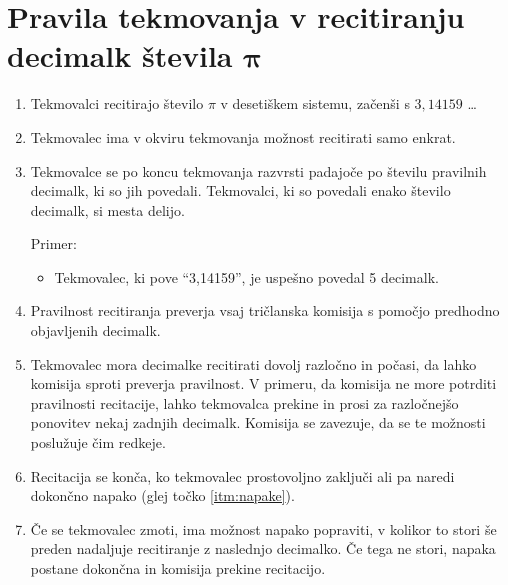 \documentclass[a4paper,oneside,12pt]{article}
\title{\Title}
\author{\Author}
\date{\today}
\theoremstyle{definition}
\begin{document}
\section*{Pravila tekmovanja v recitiranju decimalk števila $\boldsymbol \pi$}

\vspace{3ex}

\begin{enumerate}
  \item Tekmovalci recitirajo število $\pi$ v desetiškem sistemu, začenši s $3,14159$ \ldots
  \item Tekmovalec ima v okviru tekmovanja možnost recitirati samo enkrat.
  \item Tekmovalce se po koncu tekmovanja razvrsti padajoče po številu pravilnih decimalk, ki so jih povedali.
    Tekmovalci, ki so povedali enako število decimalk, si mesta delijo.

    Primer: \\[-20pt]
    \begin{itemize}
      \item Tekmovalec, ki pove ``3,14159'', je uspešno povedal 5 decimalk.
    \end{itemize}

  \item Pravilnost recitiranja preverja vsaj tričlanska komisija s pomočjo predhodno objavljenih
    decimalk.

  \item Tekmovalec mora decimalke recitirati dovolj razločno in počasi, da lahko komisija sproti preverja pravilnost. V primeru, da komisija ne more potrditi pravilnosti recitacije, lahko tekmovalca prekine in prosi za razločnejšo ponovitev nekaj zadnjih decimalk. Komisija se zavezuje, da se
  te možnosti poslužuje čim redkeje.

  \item Recitacija se konča, ko tekmovalec prostovoljno zaključi ali pa naredi dokončno napako
    (glej točko \ref{itm:napake}).

  \item \label{itm:napake} Če se tekmovalec zmoti, ima možnost napako popraviti, v kolikor to stori še preden  nadaljuje
    recitiranje z naslednjo decimalko. Če tega ne stori, napaka postane dokončna in komisija prekine
    recitacijo.


\end{enumerate}
\end{document}
